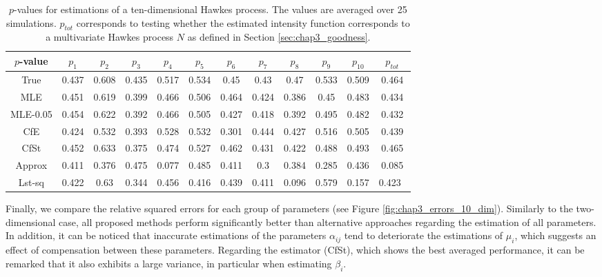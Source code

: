     \begin{table}[!ht]
    \begin{center}
    \setlength{\tabcolsep}{5pt}
    \centering
    \begin{tabular}{c|cccccccccc|c}
         $p$-value & $p_1$ & $p_2$ & $p_3$ & $p_4$ & $p_5$ & $p_6$ & $p_7$ & $p_8$& $p_9$ & $p_{10}$ & $p_{tot}$\\
         \toprule
         True & 0.437 & 0.608 & 0.435 & 0.517 & 0.534 & 0.45 & 0.43 & 0.47 & 0.533 & 0.509 & 0.464\\
         \midrule
         MLE & 0.451 & 0.619 & 0.399 & 0.466 & 0.506 & 0.464 & 0.424 & 0.386 & 0.45 & 0.483 & 0.434\\
         \midrule
         MLE-0.05 & 0.454 & 0.622 & 0.392 & 0.466 & 0.505 & 0.427 & 0.418 & 0.392 & 0.495 & 0.482 & 0.432 \\
         CfE & 0.424 & 0.532 & 0.393 & 0.528 & 0.532 & 0.301 & 0.444 & 0.427 & 0.516 & 0.505 & 0.439\\
         CfSt & 0.452 & 0.633 & 0.375 & 0.474 & 0.527 & 0.462 & 0.431 & 0.422 & 0.488 & 0.493 & 0.465\\
         \midrule
         Approx & 0.411 & 0.376 & 0.475 & 0.077 & 0.485 & 0.411 & 0.3 & 0.384 & 0.285 & 0.436 & 0.085\\
         Lst-sq & 0.422 & 0.63 & 0.344 & 0.456 & 0.416 & 0.439 & 0.411 & 0.096 & 0.579 & 0.157 & 0.423\
    \end{tabular}    
    \caption{$p$-values for estimations of a ten-dimensional Hawkes process. The values are averaged over 25 simulations. $p_{tot}$ corresponds to testing whether the estimated intensity function corresponds to a multivariate Hawkes process $N$ as defined in Section \ref{sec:chap3_goodness}.}
    \label{tab:chap3_p_values_10}
    \end{center}
    \end{table}

Finally, we compare the relative squared errors for each group of parameters (see Figure \ref{fig:chap3_errors_10_dim}). Similarly to the two-dimensional case, all proposed methods perform significantly better than alternative approaches regarding the estimation of all parameters.
In addition, it can be noticed that inaccurate estimations of the parameters $\alpha_{ij}$ tend to deteriorate the estimations of $\mu_i$, which suggests an effect of compensation between these parameters.
Regarding the estimator (CfSt), which shows the best averaged performance, it can be remarked that it also exhibits a large variance, in particular when estimating $\beta_i$. 

